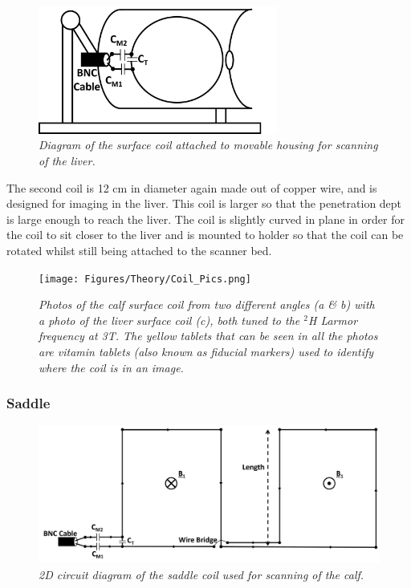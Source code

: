 \documentclass[class=article, crop=false]{standalone}
\begin{document}
\begin{figure}
    \centering
    \includegraphics[width=0.7\textwidth]{Figures/Theory/Liver_Coil.png}
    \caption{\textit{Diagram of the surface coil attached to movable housing for scanning of the liver.}}
    \label{fig:theory:Liver}
\end{figure}

The second coil is 12 cm in diameter again made out of copper wire, and is designed for imaging in the liver. This coil is larger so that the penetration dept is large enough to reach the liver. The coil is slightly curved in plane in order for the coil to sit closer to the liver and is mounted to holder so that the coil can be rotated whilst still being attached to the scanner bed.

\begin{figure}
    \centering
    \texttt{[image: Figures/Theory/Coil\_Pics.png]}
    \caption{\textit{Photos of the calf surface coil from two different angles (a \& b) with a photo of the liver surface coil (c), both tuned to the $^2$H Larmor frequency at 3T. The yellow tablets that can be seen in all the photos are vitamin tablets (also known as fiducial markers) used to identify where the coil is in an image.}}
    \label{fig:theory:Pics}
\end{figure}

\subsubsection{Saddle}

\begin{figure}
    \centering
    \includegraphics[width=1\textwidth]{Figures/Theory/Planar_Saddle.png}
    \caption{\textit{2D circuit diagram of the saddle coil used for scanning of the calf.}}
    \label{fig:theory:2D_Saddle}
\end{figure}
\end{document}
